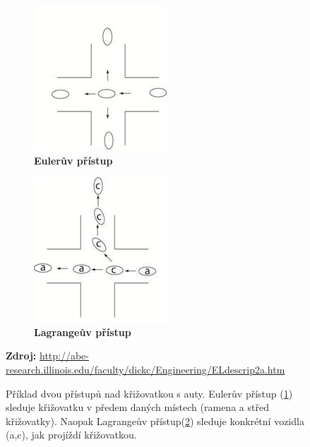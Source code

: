 \begin{figure}[h]
\centering
\begin{subfigure}{.5\textwidth}
  	\centering
	\includegraphics[width=0.7\linewidth]{obrazky-figures/EulerLagran_02.jpg}
	\caption{\textbf{Eulerův přístup}}
	\label{fig:Euler}
\end{subfigure}%
\begin{subfigure}{.5\textwidth}
  	\centering
	\includegraphics[width=0.7\linewidth]{obrazky-figures/EulerLagran_01.jpg}
	\caption{\textbf{Lagrangeův přístup}}
	\label{fig:Lagran}
\end{subfigure}
\caption{Příklad dvou přístupů nad křižovatkou s auty. Eulerův přístup (\ref{fig:Euler}) sleduje křižovatku v předem daných místech (ramena a střed křižovatky). Naopak Lagrangeův přístup(\ref{fig:Lagran}) sleduje konkrétní vozidla (a,c), jak projíždí křižovatkou.}
\textbf{Zdroj:} \url{http://abe-research.illinois.edu/faculty/dickc/Engineering/ELdescrip2a.htm}
\label{fig:ztencovani}
\end{figure}

